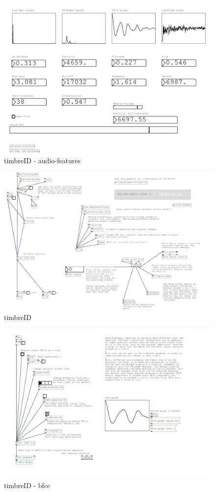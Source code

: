 \documentclass[draft]{ppgmus}
\begin{document}
\begin{figure}
\includegraphics[scale=.5]{audio-features}
\caption{timbreID - audio-features}
\label{audio-features}
\end{figure}

\begin{figure}
\includegraphics[scale=.5]{timbreid}
\caption{timbreID}
\label{timbreid}
\end{figure}

\begin{figure}
\includegraphics[scale=.6]{bfcc}
\caption{timbreID - bfcc}
\label{bfcc}
\end{figure}
\end{document}
